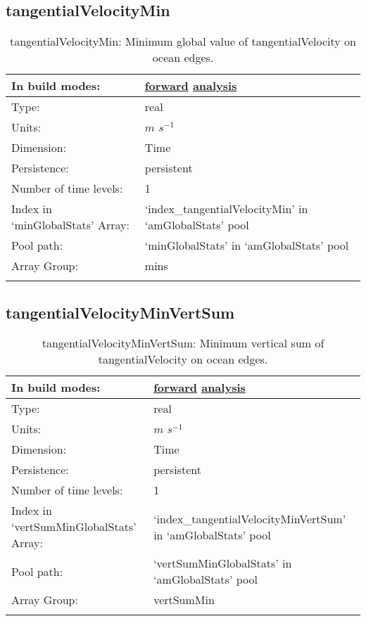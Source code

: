 \subsection[tangentialVelocityMin]{tangentialVelocityMin}
\label{subsec:var_sec_amGlobalStats_tangentialVelocityMin}
\begin{center}
\begin{longtable}{| p{2.0in} | p{4.0in} |}
        \hline 
        In build modes: & \hyperref[subsec:forward_var_tab_amGlobalStats]{forward} \hyperref[subsec:analysis_var_tab_amGlobalStats]{analysis} \\
        \hline 
        Type: & real \\
        \hline 
        Units: & $m$ $s^{-1}$ \\
        \hline 
        Dimension: & Time \\
        \hline 
        Persistence: & persistent \\
        \hline 
        Number of time levels: & 1 \\
        \hline 
		 Index in `minGlobalStats' Array: & `index\_tangentialVelocityMin' in `amGlobalStats' pool \\
		 \hline 
            Pool path: & `minGlobalStats' in `amGlobalStats' pool \\
		 \hline 
		 Array Group: & mins \\
		 \hline 
    \caption{tangentialVelocityMin: Minimum global value of tangentialVelocity on ocean edges.}
\end{longtable}
\end{center}
\subsection[tangentialVelocityMinVertSum]{tangentialVelocityMinVertSum}
\label{subsec:var_sec_amGlobalStats_tangentialVelocityMinVertSum}
\begin{center}
\begin{longtable}{| p{2.0in} | p{4.0in} |}
        \hline 
        In build modes: & \hyperref[subsec:forward_var_tab_amGlobalStats]{forward} \hyperref[subsec:analysis_var_tab_amGlobalStats]{analysis} \\
        \hline 
        Type: & real \\
        \hline 
        Units: & $m$ $s^{-1}$ \\
        \hline 
        Dimension: & Time \\
        \hline 
        Persistence: & persistent \\
        \hline 
        Number of time levels: & 1 \\
        \hline 
		 Index in `vertSumMinGlobalStats' Array: & `index\_tangentialVelocityMinVertSum' in `amGlobalStats' pool \\
		 \hline 
            Pool path: & `vertSumMinGlobalStats' in `amGlobalStats' pool \\
		 \hline 
		 Array Group: & vertSumMin \\
		 \hline 
    \caption{tangentialVelocityMinVertSum: Minimum vertical sum of tangentialVelocity on ocean edges.}
\end{longtable}
\end{center}

